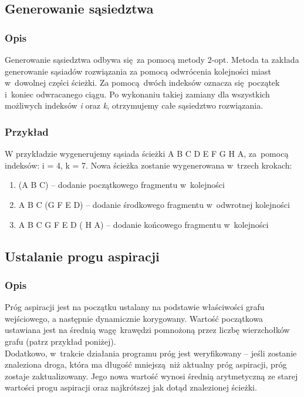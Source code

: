 \documentclass[11pt,a4paper]{article}
\begin{document}
\newpage
\subsection{Generowanie sąsiedztwa}
\label{subsec:2opt}
\subsubsection{Opis}
Generowanie sąsiedztwa odbywa się za pomocą metody 2-opt. Metoda ta zakłada generowanie sąsiadów rozwiązania za pomocą odwrócenia kolejności miast w~dowolnej części ścieżki. Za pomocą dwóch indeksów oznacza się początek i~koniec odwracanego ciągu. Po wykonaniu takiej zamiany dla wszystkich możliwych indeksów \textit{i} oraz \textit{k}, otrzymujemy całe sąsiedztwo rozwiązania.

\subsubsection{Przykład}
W przykładzie wygenerujemy sąsiada ścieżki A  B  C  D  E  F  G  H  A, za~pomocą indeksów: i = 4, k = 7. Nowa ścieżka zostanie wygenerowana w~trzech krokach:
\begin{enumerate}
  \item (A  B  C) -- dodanie początkowego fragmentu w~kolejności
  \item A  B  C  (G  F  E  D) -- dodanie środkowego fragmentu w~odwrotnej kolejności
  \item A  B  C  G  F  E  D ( H  A) -- dodanie końcowego fragmentu w~kolejności
\end{enumerate}

\subsection{Ustalanie progu aspiracji}
\label{subsec:aspiracja}
\subsubsection{Opis}
Próg aspiracji jest na początku ustalany na podstawie właściwości grafu wejściowego, a następnie dynamicznie korygowany. Wartość początkowa ustawiana jest na średnią wagę krawędzi pomnożoną przez liczbę wierzchołków grafu (patrz przykład poniżej).\\
Dodatkowo, w~trakcie działania programu próg jest weryfikowany -- jeśli zostanie znaleziona droga, która ma długość mniejszą niż aktualny próg aspiracji, próg zostaje zaktualizowany. Jego nowa wartość wynosi średnią arytmetyczną ze starej wartości progu aspiracji oraz najkrótszej jak dotąd znalezionej ścieżki.
\end{document}
